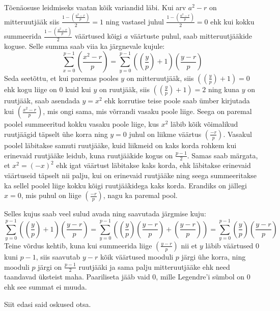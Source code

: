 \documentclass[a4paper, 10pt]{article}
\newcommand{\leg}[2]{\left(\frac{#1}{#2}\right)}
\begin{document}
Tõenäosuse leidmiseks vaatan kõik variandid läbi. Kui arv $a^2-r$ on mitteruutjääk siis $\frac{1-\leg {a^2-r}p}2=1$ ning vastasel juhul $\frac{1-\leg {a^2-r}p}2=0$ ehk kui kokku summeerida $\frac{1-\leg {a^2-r}p}2$ väärtused kõigi $a$ väärtuste puhul, saab mitteruutjääkide koguse. Selle summa saab viia ka järgnevale kujule: $$\sum_{x=0}^{p-1}\leg{x^2-r}{p}=\sum_{y=0}^{p-1}\left(\leg{y}{p}+1\right)\leg{y-r}{p}$$ Seda seetõttu, et kui paremas pooles $y$ on mitteruutjääk, siis $\left(\leg{y}{p}+1\right)=0$ ehk kogu liige on 0 kuid kui $y$ on ruutjääk, siis $\left(\leg{y}{p}+1\right)=2$ ning kuna $y$ on ruutjääk, saab asendada $y=x^2$ ehk korrutise teise poole saab ümber kirjutada kui $\leg{x^2-r}p$, mis ongi sama, mis võrrandi vasaku poole liige. Seega on paremal poolel summeeritud kokku vasaku poole liige, kus $x^2$ läbib kõik võimalikud ruutjäägid täpselt ühe korra ning $y=0$ juhul on liikme väärtus $\leg{-r}p$. Vasakul poolel läbitakse samuti ruutjääke, kuid liikmeid on kaks korda rohkem kui erinevaid ruutjääke leidub, kuna ruutjääkide kogus on $\frac{p-1}2$. Samas saab märgata, et $x^2=(-x)^2$ ehk igat väärtust läbitakse kaks korda, ehk läbitakse erinevaid väärtuseid täpselt nii palju, kui on erinevaid ruutjääke ning seega summeeritakse ka sellel poolel liige kokku kõigi ruutjääkidega kaks korda. Erandiks on jällegi $x=0$, mis puhul on liige $\leg{-r}p$, nagu ka paremal pool.

Selles kujus saab veel sulud avada ning saavutada järgmise kuju: $$\sum_{y=0}^{p-1}\left(\leg{y}{p}+1\right)\leg{y-r}{p}=\sum_{y=0}^{p-1}\left(\leg{y}{p}\leg{y-r}{p}+\leg{y-r}{p}\right)=\sum_{y=0}^{p-1}\leg{y}{p}\leg{y-r}{p}$$ Teine võrdus kehtib, kuna kui summeerida liige $\leg{y-r}p$ nii et $y$ läbib väärtused 0 kuni $p-1$, siis saavutab $y-r$ kõik väärtused mooduli $p$ järgi ühe korra, ning mooduli $p$ järgi on $\frac{p-1}2$ ruutjääki ja sama palju mitteruutjääke ehk need taandavad üksteist maha. Paariliseta jääb vaid 0, mille Legendre'i sümbol on 0 ehk see summat ei muuda.

Siit edasi said oskused otsa.
\bigskip
\end{document}
